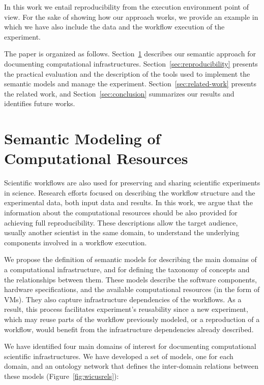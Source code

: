 \documentclass[final,5p,times,twocolumn]{elsarticle}
\begin{document}
In this work we entail reproducibility from the execution environment point of view. For  the sake of showing how our approach works, we provide an example in which we have also include the data and the workflow execution of the experiment.

The paper is organized as follows. Section~\ref{sec:semantic} describes our semantic approach for documenting computational infrastructures. Section~\ref{sec:reproducibility} presents the practical evaluation and the description of the tools used to implement the semantic models and manage the experiment. Section~\ref{sec:related-work} presents the related work, and Section~\ref{sec:conclusion} summarizes our results and identifies future works.



\section{Semantic Modeling of Computational Resources}
\label{sec:semantic}

Scientific workflows are also used for preserving and sharing scientific experiments in science. Research efforts focused on describing the workflow structure and the experimental data, both input data and results.
In this work, we argue that the information about the computational resources should be also provided for achieving full reproducibility. 
These descriptions  allow the target audience, usually another scientist in the same domain, to understand the underlying components involved in a workflow execution.

We propose the definition of semantic models for describing the main domains of a computational infrastructure, and for defining the taxonomy of concepts and the relationships between them. These models describe the software components, hardware specifications, and the available computational resources (in the form of VMs). They also capture infrastructure dependencies of the workflows. As a result, this process facilitates experiment's reusability since a new experiment, which may reuse parts of the workflow previously modeled, or a reproduction of a workflow, would benefit from the infrastructure dependencies already described.

We have identified four main domains of interest for documenting computational scientific infrastructures. We have developed a set of models, one for each domain, and an ontology network that defines the inter-domain relations between these models (Figure~\ref{fig:wicusrels}):
\end{document}
